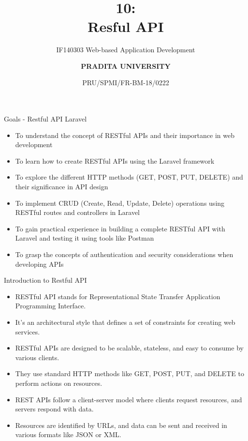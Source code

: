 \documentclass[aspectratio=169, table]{beamer}
\subtitle{IF140303 Web-based Application Development}
\title{\Huge {\textbf{10: \\Resful API}}}
\date[Serial]{\scriptsize {PRU/SPMI/FR-BM-18/0222}}
\author[Pradita]{\small {\textbf{PRADITA UNIVERSITY}}}
\begin{document}
\begin{frame}
    \titlepage
\end{frame}

\begin{frame}{Goals - Restful API Laravel}
\vskip1cm
    \begin{itemize}
        \item To understand the concept of RESTful APIs and their importance in web development
        \item To learn how to create RESTful APIs using the Laravel framework
        \item To explore the different HTTP methods (GET, POST, PUT, DELETE) and their significance in API design
        \item To implement CRUD (Create, Read, Update, Delete) operations using RESTful routes and controllers in Laravel
        \item To gain practical experience in building a complete RESTful API with Laravel and testing it using tools like Postman
        \item To grasp the concepts of authentication and security considerations when developing APIs
    \end{itemize}
\end{frame}

\begin{frame}{Introduction to Restful API}
    \vskip1cm
    \begin{itemize}
        \item RESTful API stands for Representational State Transfer Application Programming Interface.
        \item It's an architectural style that defines a set of constraints for creating web services.
        \item RESTful APIs are designed to be scalable, stateless, and easy to consume by various clients.
        \item They use standard HTTP methods like GET, POST, PUT, and DELETE to perform actions on resources.
        \item REST APIs follow a client-server model where clients request resources, and servers respond with data.
        \item Resources are identified by URLs, and data can be sent and received in various formats like JSON or XML.
    \end{itemize}
\end{frame}
\end{document}
